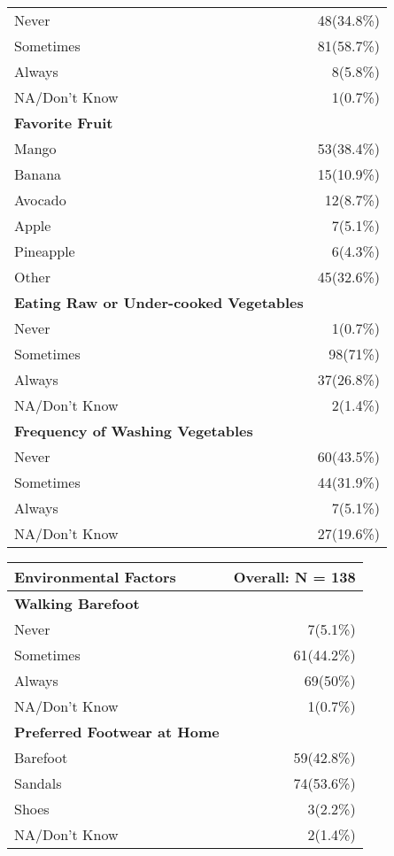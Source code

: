 \documentclass[4pt,letterpaper]{article}
\begin{document}
\begin{multicols}{2}
\begin{center}
\begin{tabular}{p{5cm}r}
Never & 48(34.8\%) \\
Sometimes & 81(58.7\%) \\
Always & 8(5.8\%) \\
NA/Don't Know & 1(0.7\%) \\
\midrule
\textbf{Favorite Fruit} & \\
Mango & 53(38.4\%) \\
Banana & 15(10.9\%) \\
Avocado & 12(8.7\%) \\
Apple & 7(5.1\%) \\
Pineapple & 6(4.3\%) \\
Other & 45(32.6\%) \\
\midrule
\textbf{Eating Raw or Under-cooked Vegetables} & \\
Never & 1(0.7\%) \\
Sometimes & 98(71\%) \\
Always & 37(26.8\%) \\
NA/Don't Know & 2(1.4\%) \\
\midrule
\textbf{Frequency of Washing Vegetables} & \\
Never & 60(43.5\%) \\
Sometimes & 44(31.9\%) \\
Always & 7(5.1\%) \\
NA/Don't Know & 27(19.6\%) \\
\bottomrule
\end{tabular}
\end{center}

\begin{center}
\begin{tabular}{p{5cm}r}
\toprule
\textbf{Environmental Factors} & \textbf{Overall: N = 138} \\
\midrule
\textbf{Walking Barefoot} & \\
Never & 7(5.1\%) \\
Sometimes & 61(44.2\%) \\
Always & 69(50\%) \\
NA/Don't Know & 1(0.7\%) \\
\midrule
\textbf{Preferred Footwear at Home} & \\
Barefoot & 59(42.8\%) \\
Sandals & 74(53.6\%) \\
Shoes & 3(2.2\%) \\
NA/Don't Know & 2(1.4\%) \\
\bottomrule
\end{tabular}
\end{center}


\end{multicols} %
\end{document}
